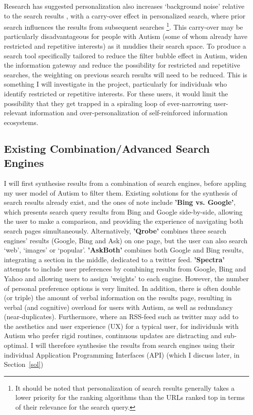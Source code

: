 \documentclass[a4paper, 10pt]{article}
\begin{document}
Research has suggested personalization also increases ‘background noise’ relative to the search results \cite{briggs}, with a carry-over effect in personalized search, where prior search influences the results from subsequent searches \footnote{It should be noted that personalization of search results generally takes a lower priority for the ranking algorithms than the URLs ranked top in terms of their relevance for the search query.}. This carry-over may be particularly disadvantageous for people with Autism (some of whom already have restricted and repetitive interests) as it muddies their search space. To produce a search tool specifically tailored to reduce the filter bubble effect in Autism, widen the information gateway and reduce the possibility for restricted and repetitive searches, the weighting on previous search results will need to be reduced. This is something I will investigate in the project, particularly for individuals who identify restricted or repetitive interests. For these users, it would limit the possibility that they get trapped in a spiraling loop of ever-narrowing user-relevant information and over-personalization of self-reinforced information ecosystems.


\subsection{Existing Combination/Advanced Search Engines}\label{Existing Combination/Advanced Search Engines}
I will first synthesise results from a combination of search engines, before appling my user model of Autism to filter them. Existing solutions for the synthesis of search results already exist, and the ones of note include \textbf{'Bing vs. Google'}, which presents search query results from Bing and Google side-by-side, allowing the user to make a comparison, and providing the experience of navigating both search pages simultaneously. Alternatively, \textbf{'Qrobe'} combines three search engines’ results (Google, Bing and Ask) on one page, but the user can also search ‘web’, ‘images’ or ‘popular’. \textbf{'AskBoth'} combines both Google and Bing results, integrating a section in the middle, dedicated to a twitter feed. \textbf{'Spectra'} attempts to include user preferences by combining results from Google, Bing and Yahoo and allowing users to assign 'weights' to each engine. However, the number of personal preference options is very limited. In addition, there is often double (or triple) the amount of verbal information on the results page, resulting in verbal (and cognitive) overload for users with Autism, as well as redundancy (near-duplicates). Furthermore, where an RSS-feed such as twitter may add to the aesthetics and user experience (UX) for a typical user, for individuals with Autism who prefer rigid routines, continuous updates are distracting and sub-optimal. I will therefore synthesise the results from search engines using their individual Application Programming Interfaces (API) (which I discuss later, in Section~\ref{sol})
\end{document}
